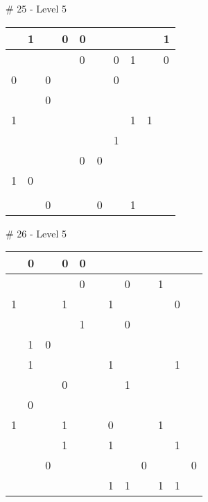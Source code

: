 \medskip

\# 25 - Level 5 \newline
\begin{tabular}{|m{\collen}|m{\collen}|m{\collen}|m{\collen}|m{\collen}|m{\collen}|m{\collen}|m{\collen}|m{\collen}|m{\collen}|}
\hline
    & 1 &   & 0 & 0 &   &   &   &   & 1 \\
\hline
    &   &   &   & 0 &   & 0 & 1 &   & 0 \\
\hline
  0 &   & 0 &   &   &   & 0 &   &   &   \\
\hline
    &   & 0 &   &   &   &   &   &   &   \\
\hline
  1 &   &   &   &   &   &   & 1 & 1 &   \\
\hline
    &   &   &   &   &   & 1 &   &   &   \\
\hline
    &   &   &   & 0 & 0 &   &   &   &   \\
\hline
  1 & 0 &   &   &   &   &   &   &   &   \\
\hline
    &   &   &   &   &   &   &   &   &   \\
\hline
    &   & 0 &   &   & 0 &   & 1 &   &   \\
\hline
\end{tabular}


\medskip

\# 26 - Level 5 \newline
\begin{tabular}{|m{\collen}|m{\collen}|m{\collen}|m{\collen}|m{\collen}|m{\collen}|m{\collen}|m{\collen}|m{\collen}|m{\collen}|m{\collen}|m{\collen}|}
\hline
    & 0 &   & 0 & 0 &   &   &   &   &   &   &   \\
\hline
    &   &   &   & 0 &   &   & 0 &   & 1 &   &   \\
\hline
  1 &   &   & 1 &   &   & 1 &   &   &   & 0 &   \\
\hline
    &   &   &   & 1 &   &   & 0 &   &   &   &   \\
\hline
    & 1 & 0 &   &   &   &   &   &   &   &   &   \\
\hline
    & 1 &   &   &   &   & 1 &   &   &   & 1 &   \\
\hline
    &   &   & 0 &   &   &   & 1 &   &   &   &   \\
\hline
    & 0 &   &   &   &   &   &   &   &   &   &   \\
\hline
  1 &   &   & 1 &   &   & 0 &   &   & 1 &   &   \\
\hline
    &   &   & 1 &   &   & 1 &   &   &   & 1 &   \\
\hline
    &   & 0 &   &   &   &   &   & 0 &   &   & 0 \\
\hline
    &   &   &   &   &   & 1 & 1 &   & 1 & 1 &   \\
\hline
\end{tabular}


